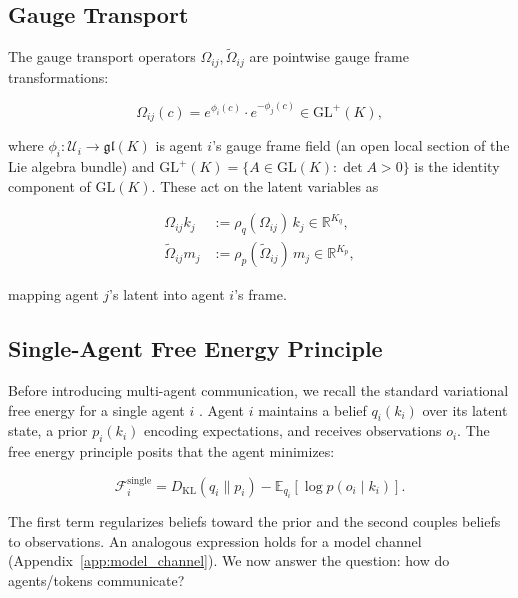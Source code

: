 \documentclass[twoside,11pt]{article}
\begin{document}
\subsection{Gauge Transport}

The gauge transport operators $\Omega_{ij}, \tilde{\Omega}_{ij}$ are pointwise gauge frame transformations:

\begin{equation}
\Omega_{ij}(c) = e^{\phi_i(c)} \cdot e^{-\phi_j(c)} \in \mathrm{GL}^+(K),
\label{eq:gauge_frame_rotation}
\end{equation}

where $\phi_i: \mathcal{U}_i \to \mathfrak{gl}(K)$ is agent $i$'s gauge frame field (an open local section of the Lie algebra bundle) and $\mathrm{GL}^+(K) = \{A \in \mathrm{GL}(K) : \det A > 0\}$ is the identity component of $\mathrm{GL}(K)$. These act on the latent variables as

\begin{equation}
\begin{aligned}
\Omega_{ij} k_j
&:= \rho_q(\Omega_{ij}) \, k_j
\in \mathbb{R}^{K_q},\\
\tilde{\Omega}_{ij} m_j
&:= \rho_p(\tilde{\Omega}_{ij}) \, m_j
\in \mathbb{R}^{K_p},
\end{aligned}
\label{eq:gauge_action_on_vectors}
\end{equation}

mapping agent $j$'s latent into agent $i$'s frame.


\subsection{Single-Agent Free Energy Principle}

Before introducing multi-agent communication, we recall the standard variational free energy for a single agent $i$ \citep{friston2010free,parr2022active}. Agent $i$ maintains a belief $q_i(k_i)$ over its latent state, a prior $p_i(k_i)$ encoding expectations, and receives observations $o_i$. The free energy principle posits that the agent minimizes:

\begin{equation}
\mathcal{F}_i^{\text{single}} = D_{\mathrm{KL}}(q_i \| p_i) - \mathbb{E}_{q_i}[\log p(o_i \mid k_i)].
\label{eq:single_agent_fep}
\end{equation}

The first term regularizes beliefs toward the prior and the second couples beliefs to observations. An analogous expression holds for a model channel (Appendix~\ref{app:model_channel}). We now answer the question: how do agents/tokens communicate?
\end{document}
